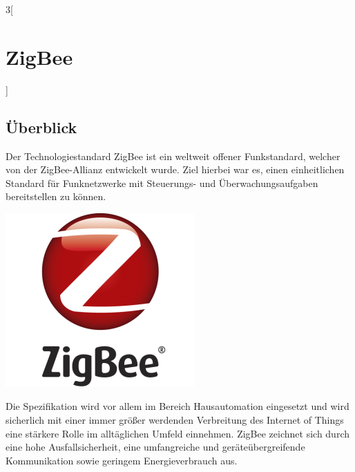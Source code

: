 \begin{multicols}{3}[\section{ZigBee}]
\subsection*{Überblick}
Der Technologiestandard ZigBee ist ein weltweit offener Funkstandard, welcher von der ZigBee-Allianz entwickelt wurde. Ziel hierbei war es, einen einheitlichen Standard für Funknetzwerke mit Steuerungs- und Überwachungsaufgaben bereitstellen zu können.~\cite{zigbee.1} 
\begin{Figure}
\includegraphics[width=\linewidth]{Kapitel/ZigBee/Grafiken/zigbee_logo.png}
\end{Figure}
Die Spezifikation wird vor allem im Bereich Hausautomation eingesetzt und wird sicherlich mit einer immer größer werdenden Verbreitung des Internet of Things eine stärkere Rolle im alltäglichen Umfeld einnehmen. 
ZigBee zeichnet sich durch eine hohe Ausfallsicherheit, eine umfangreiche und geräteübergreifende Kommunikation sowie geringem Energieverbrauch aus.~\cite{zigbee.2}


\end{multicols}
